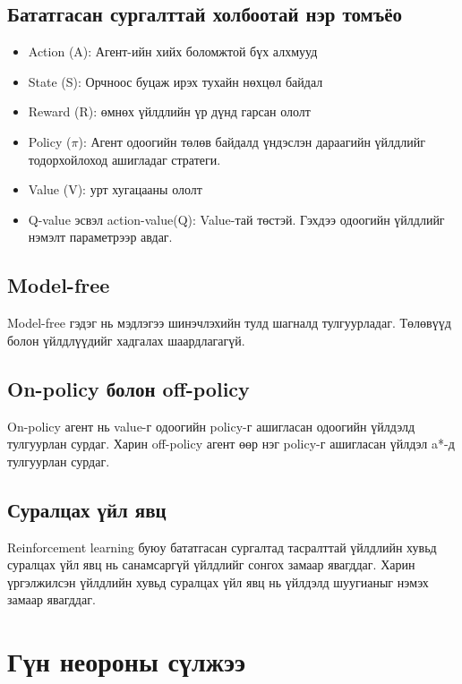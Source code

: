 \documentclass[12pt,A4]{report}
\begin{document}
\subsection{Бататгасан сургалттай холбоотай нэр томъёо}

\begin{itemize}
	\item Action (A): Агент-ийн хийх боломжтой бүх алхмууд
	\item State (S): Орчноос буцаж ирэх тухайн нөхцөл байдал
	\item Reward (R): өмнөх үйлдлийн үр дүнд гарсан ололт
	\item Policy (\(\pi\)): Агент одоогийн төлөв байдалд үндэслэн дараагийн үйлдлийг тодорхойлоход ашигладаг стратеги. 
	\item Value (V): урт хугацааны ололт
	\item Q-value эсвэл action-value(Q): Value-тай төстэй. Гэхдээ одоогийн үйлдлийг нэмэлт параметрээр авдаг.
\end{itemize}

\subsection{Model-free}

Model-free гэдэг нь мэдлэгээ шинэчлэхийн тулд шагналд тулгуурладаг. Төлөвүүд болон үйлдлүүдийг хадгалах шаардлагагүй. 

\subsection{On-policy болон off-policy}

On-policy агент нь value-г одоогийн policy-г ашигласан одоогийн үйлдэлд тулгуурлан сурдаг. Харин off-policy агент өөр нэг policy-г ашигласан үйлдэл a*-д тулгуурлан сурдаг.

\subsection{Суралцах үйл явц}

Reinforcement learning буюу бататгасан сургалтад тасралттай үйлдлийн хувьд суралцах үйл явц нь санамсаргүй үйлдлийг сонгох замаар явагддаг. Харин үргэлжилсэн үйлдлийн хувьд суралцах үйл явц нь үйлдэлд шуугианыг нэмэх замаар явагддаг.

\section{Гүн неороны сүлжээ}
\end{document}
